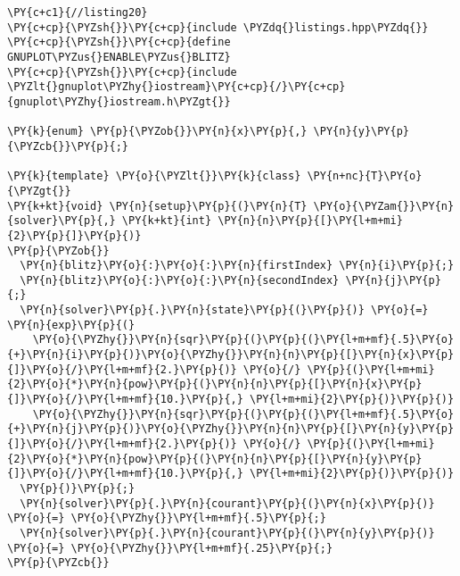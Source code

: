 \begin{Verbatim}[commandchars=\\\{\}]
\PY{c+c1}{//listing20}
\PY{c+cp}{\PYZsh{}}\PY{c+cp}{include \PYZdq{}listings.hpp\PYZdq{}}
\PY{c+cp}{\PYZsh{}}\PY{c+cp}{define GNUPLOT\PYZus{}ENABLE\PYZus{}BLITZ}
\PY{c+cp}{\PYZsh{}}\PY{c+cp}{include \PYZlt{}gnuplot\PYZhy{}iostream}\PY{c+cp}{/}\PY{c+cp}{gnuplot\PYZhy{}iostream.h\PYZgt{}}

\PY{k}{enum} \PY{p}{\PYZob{}}\PY{n}{x}\PY{p}{,} \PY{n}{y}\PY{p}{\PYZcb{}}\PY{p}{;}

\PY{k}{template} \PY{o}{\PYZlt{}}\PY{k}{class} \PY{n+nc}{T}\PY{o}{\PYZgt{}}
\PY{k+kt}{void} \PY{n}{setup}\PY{p}{(}\PY{n}{T} \PY{o}{\PYZam{}}\PY{n}{solver}\PY{p}{,} \PY{k+kt}{int} \PY{n}{n}\PY{p}{[}\PY{l+m+mi}{2}\PY{p}{]}\PY{p}{)} 
\PY{p}{\PYZob{}}
  \PY{n}{blitz}\PY{o}{:}\PY{o}{:}\PY{n}{firstIndex} \PY{n}{i}\PY{p}{;}
  \PY{n}{blitz}\PY{o}{:}\PY{o}{:}\PY{n}{secondIndex} \PY{n}{j}\PY{p}{;}
  \PY{n}{solver}\PY{p}{.}\PY{n}{state}\PY{p}{(}\PY{p}{)} \PY{o}{=} \PY{n}{exp}\PY{p}{(}
    \PY{o}{\PYZhy{}}\PY{n}{sqr}\PY{p}{(}\PY{p}{(}\PY{l+m+mf}{.5}\PY{o}{+}\PY{n}{i}\PY{p}{)}\PY{o}{\PYZhy{}}\PY{n}{n}\PY{p}{[}\PY{n}{x}\PY{p}{]}\PY{o}{/}\PY{l+m+mf}{2.}\PY{p}{)} \PY{o}{/} \PY{p}{(}\PY{l+m+mi}{2}\PY{o}{*}\PY{n}{pow}\PY{p}{(}\PY{n}{n}\PY{p}{[}\PY{n}{x}\PY{p}{]}\PY{o}{/}\PY{l+m+mf}{10.}\PY{p}{,} \PY{l+m+mi}{2}\PY{p}{)}\PY{p}{)}
    \PY{o}{\PYZhy{}}\PY{n}{sqr}\PY{p}{(}\PY{p}{(}\PY{l+m+mf}{.5}\PY{o}{+}\PY{n}{j}\PY{p}{)}\PY{o}{\PYZhy{}}\PY{n}{n}\PY{p}{[}\PY{n}{y}\PY{p}{]}\PY{o}{/}\PY{l+m+mf}{2.}\PY{p}{)} \PY{o}{/} \PY{p}{(}\PY{l+m+mi}{2}\PY{o}{*}\PY{n}{pow}\PY{p}{(}\PY{n}{n}\PY{p}{[}\PY{n}{y}\PY{p}{]}\PY{o}{/}\PY{l+m+mf}{10.}\PY{p}{,} \PY{l+m+mi}{2}\PY{p}{)}\PY{p}{)}
  \PY{p}{)}\PY{p}{;}  
  \PY{n}{solver}\PY{p}{.}\PY{n}{courant}\PY{p}{(}\PY{n}{x}\PY{p}{)} \PY{o}{=} \PY{o}{\PYZhy{}}\PY{l+m+mf}{.5}\PY{p}{;} 
  \PY{n}{solver}\PY{p}{.}\PY{n}{courant}\PY{p}{(}\PY{n}{y}\PY{p}{)} \PY{o}{=} \PY{o}{\PYZhy{}}\PY{l+m+mf}{.25}\PY{p}{;}
\PY{p}{\PYZcb{}}


\end{Verbatim}
